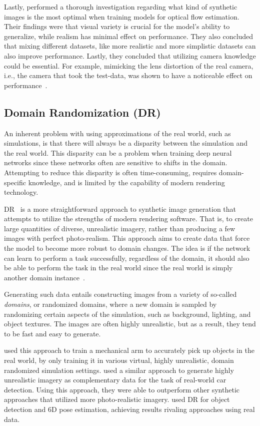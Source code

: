 Lastly, \textcite{goodsynthetic} performed a thorough investigation regarding what kind of synthetic images is the most optimal when training models for optical flow estimation. Their findings were that visual variety is crucial for the model's ability to generalize, while realism has minimal effect on performance. They also concluded that mixing different datasets, like more realistic and more simplistic datasets can also improve performance. Lastly, they concluded that utilizing camera knowledge could be essential. For example, mimicking the lens distortion of the real camera, i.e., the camera that took the test-data, was shown to have a noticeable effect on performance~\cite{goodsynthetic}.

\subsection{Domain Randomization (DR)}
An inherent problem with using approximations of the real world, such as simulations, is that there will always be a disparity between the simulation and the real world. This disparity can be a problem when training deep neural networks since these networks often are sensitive to shifts in the domain. Attempting to reduce this disparity is often time-consuming, requires domain-specific knowledge, and is limited by the capability of modern rendering technology.

\Gls{DR}~\cite{domainrand, domainrandcars} is a more straightforward approach to synthetic image generation that attempts to utilize the strengths of modern rendering software. That is, to create large quantities of diverse, unrealistic imagery, rather than producing a few images with perfect photo-realism. This approach aims to create data that force the model to become more robust to domain changes.  The idea is if the network can learn to perform a task successfully, regardless of the domain, it should also be able to perform the task in the real world since the real world is simply another domain instance~\cite{domainrand}.

Generating such data entails constructing images from a variety of so-called \textit{domains}, or randomized domains, where a new domain is sampled by randomizing certain aspects of the simulation, such as background, lighting, and object textures. The images are often highly unrealistic, but as a result, they tend to be fast and easy to generate.

\textcite{domainrand} used this approach to train a mechanical arm to accurately pick up objects in the real world, by only training it in various virtual, highly unrealistic, domain randomized simulation settings. \textcite{domainrandcars} used a similar approach to generate highly unrealistic imagery as complementary data for the task of real-world car detection. Using this approach, they were able to outperform other synthetic approaches that utilized more photo-realistic imagery. \textcite{domainrandpose} used \gls{DR} for object detection and 6D pose estimation, achieving results rivaling approaches using real data.

